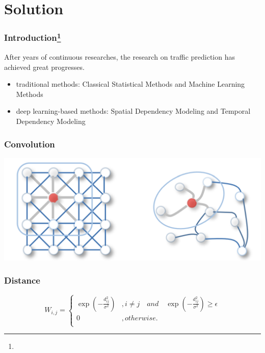 \documentclass{beamer}
\begin{document}
\section{Solution}

\begin{frame}
	\frametitle{Introduction\footnote{}}
  After years of continuous researches, the research on traffic prediction has achieved great progresses.
  \begin{itemize}
    \item traditional methods: Classical Statistical Methods and Machine Learning Methods
    \item deep learning-based methods: Spatial Dependency Modeling and Temporal Dependency Modeling
  \end{itemize}
\end{frame}
\begin{frame}
	\frametitle{Convolution}
	\includegraphics[width=\textwidth]{img/convolution.png}
\end{frame}
\begin{frame}
  \frametitle{Distance}
  \begin{equation}
    W_{i,j} = \left\{
      \begin{array}{ll}
        \exp(-\frac{d^{2}_{ij}}{\sigma^{2}}) & , i \neq j \quad and \quad \exp(-\frac{d^{2}_{ij}}{\sigma^{2}}) \geq \epsilon \\
        0 & , otherwise. \\
      \end{array}\right.
    \label{eq:distance}
  \end{equation}
\end{frame}
\end{document}
